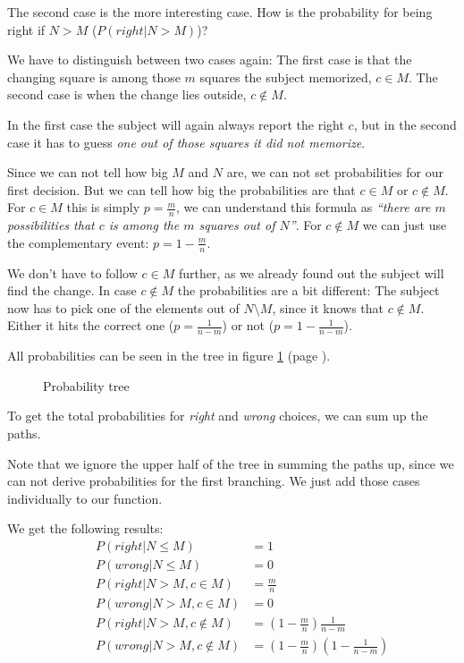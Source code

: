 {The second case is the more interesting case. How is the probability for being 
right if $N > M$ ($P(right | N > M)$)?

We have to distinguish between two cases again: The first case is that the 
changing square is among those $m$ squares the subject memorized, $c \in M$. 
The second case is when the change lies outside, $c \notin M$.

In the first case the subject will again always report the right $c$, but in the
second case it has to guess \textit{one out of those squares it did not memorize}.

Since we can not tell how big $M$ and $N$ are, we can not set probabilities for 
our first decision. But we can tell how big the probabilities are that $c \in M$ 
or $c \notin M$. For $c \in M$ this is simply $p = \frac{m}{n}$, we can understand 
this formula as \textit{``there are $m$ possibilities that $c$ is among the $m$ 
squares out of $N$''}. For $c \notin M$ we can just use the complementary event:
$p = 1 - \frac{m}{n}$.

We don't have to follow $c \in M$ further, as we already found out the subject 
will find the change. In case $c \notin M$ the probabilities are a bit different: 
The subject now has to pick one of the elements out of $N \setminus M$, since it 
knows that $c \notin M$. Either it hits the correct one ($p = \frac{1}{n - m}$)
or not ($p = 1 - \frac{1}{n - m}$).

All probabilities can be seen in the tree in figure \ref{tree} (page \pageref{tree}).

\begin{figure}
  
  \caption{Probability tree}
  \label{tree}
\end{figure}

To get the total probabilities for \textit{right} and \textit{wrong} choices, we 
can sum up the paths.

Note that we ignore the upper half of the tree in summing the paths up, since we 
can not derive probabilities for the first branching. We just add those cases 
individually to our function.

We get the following results:
\begin{align*}
&&P(right | N \leq M) &= 1 \\
&&P(wrong | N \leq M) &= 0 \\
&&P(right | N > M, c \in M) &= \frac{m}{n} \\
&&P(wrong | N > M, c \in M) &= 0 \\
&&P(right | N > M, c \notin M) &= \left(1 - \frac{m}{n}\right) \frac{1}{n-m} \\
&&P(wrong | N > M, c \notin M) &= \left(1 - \frac{m}{n}\right) \left(1 - \frac{1}{n-m}\right)
\end{align*}

}

